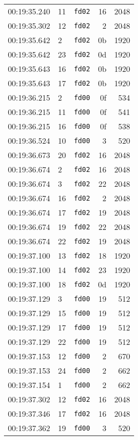 \documentclass{article}
\begin{document}
\begin{longtable}{lllrr}
00:19:35.240 & 11 & \texttt{fd02} & 16 & 2048 \\
00:19:35.302 & 12 & \texttt{fd02} & 2 & 2048 \\
00:19:35.642 & 2 & \texttt{fd02} & 0b & 1920 \\
00:19:35.642 & 23 & \texttt{fd02} & 0d & 1920 \\
00:19:35.643 & 16 & \texttt{fd02} & 0b & 1920 \\
00:19:35.643 & 17 & \texttt{fd02} & 0b & 1920 \\
00:19:36.215 & 2 & \texttt{fd00} & 0f & 534 \\
00:19:36.215 & 11 & \texttt{fd00} & 0f & 541 \\
00:19:36.215 & 16 & \texttt{fd00} & 0f & 538 \\
00:19:36.524 & 10 & \texttt{fd00} & 3 & 520 \\
00:19:36.673 & 20 & \texttt{fd02} & 16 & 2048 \\
00:19:36.674 & 2 & \texttt{fd02} & 16 & 2048 \\
00:19:36.674 & 3 & \texttt{fd02} & 22 & 2048 \\
00:19:36.674 & 16 & \texttt{fd02} & 2 & 2048 \\
00:19:36.674 & 17 & \texttt{fd02} & 19 & 2048 \\
00:19:36.674 & 19 & \texttt{fd02} & 22 & 2048 \\
00:19:36.674 & 22 & \texttt{fd02} & 19 & 2048 \\
00:19:37.100 & 13 & \texttt{fd02} & 18 & 1920 \\
00:19:37.100 & 14 & \texttt{fd02} & 23 & 1920 \\
00:19:37.100 & 18 & \texttt{fd02} & 0d & 1920 \\
00:19:37.129 & 3 & \texttt{fd00} & 19 & 512 \\
00:19:37.129 & 15 & \texttt{fd00} & 19 & 512 \\
00:19:37.129 & 17 & \texttt{fd00} & 19 & 512 \\
00:19:37.129 & 22 & \texttt{fd00} & 19 & 512 \\
00:19:37.153 & 12 & \texttt{fd00} & 2 & 670 \\
00:19:37.153 & 24 & \texttt{fd00} & 2 & 662 \\
00:19:37.154 & 1 & \texttt{fd00} & 2 & 662 \\
00:19:37.302 & 12 & \texttt{fd02} & 16 & 2048 \\
00:19:37.346 & 17 & \texttt{fd02} & 16 & 2048 \\
00:19:37.362 & 19 & \texttt{fd00} & 3 & 520 \\

\end{longtable}
\end{document}
